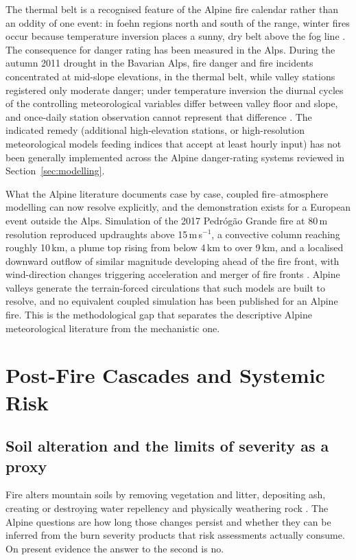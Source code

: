 \documentclass[11pt,a4paper]{article}
\begin{document}
The thermal belt is a recognised feature of the Alpine fire calendar rather than an oddity of one event: in foehn regions north and south of the range, winter fires occur because temperature inversion places a sunny, dry belt above the fog line \citep{muller_forest_2020}. The consequence for danger rating has been measured in the Alps. During the autumn 2011 drought in the Bavarian Alps, fire danger and fire incidents concentrated at mid-slope elevations, in the thermal belt, while valley stations registered only moderate danger; under temperature inversion the diurnal cycles of the controlling meteorological variables differ between valley floor and slope, and once-daily station observation cannot represent that difference \citep{schunk_forest_2013}. The indicated remedy (additional high-elevation stations, or high-resolution meteorological models feeding indices that accept at least hourly input) has not been generally implemented across the Alpine danger-rating systems reviewed in Section~\ref{sec:modelling}.

What the Alpine literature documents case by case, coupled fire--atmosphere modelling can now resolve explicitly, and the demonstration exists for a European event outside the Alps. Simulation of the 2017 Pedr\'og\~ao Grande fire at 80\,m resolution reproduced updraughts above 15\,m\,s$^{-1}$, a convective column reaching roughly 10\,km, a plume top rising from below 4\,km to over 9\,km, and a localised downward outflow of similar magnitude developing ahead of the fire front, with wind-direction changes triggering acceleration and merger of fire fronts \citep{couto_numerical_2024}. Alpine valleys generate the terrain-forced circulations that such models are built to resolve, and no equivalent coupled simulation has been published for an Alpine fire. This is the methodological gap that separates the descriptive Alpine meteorological literature from the mechanistic one.


\section{Post-Fire Cascades and Systemic Risk}
\label{sec:cascade}

\subsection{Soil alteration and the limits of severity as a proxy}

Fire alters mountain soils by removing vegetation and litter, depositing ash, creating or destroying water repellency and physically weathering rock \citep{santi_wildfire_2022}. The Alpine questions are how long those changes persist and whether they can be inferred from the burn severity products that risk assessments actually consume. On present evidence the answer to the second is no.
\end{document}
